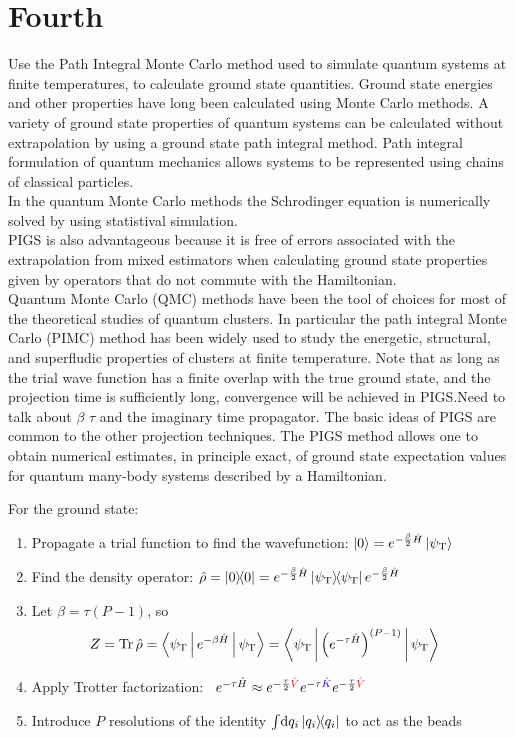 \documentclass[12pt,letterpaper, oneside, draft]{article}              %
\numberwithin{equation}{section} %
\newcommand{\psiT}{\psi_{\textrm{T}}}
\DeclareMathOperator{\Tr}{Tr}
\begin{document}
\section{Fourth}
 Use the Path Integral Monte Carlo method used to simulate quantum systems at finite temperatures, to calculate ground state quantities. Ground state energies and other properties have long been calculated using Monte Carlo methods. A variety of ground state properties of quantum systems can be calculated without extrapolation by using a ground state path integral method. Path integral formulation of quantum mechanics allows systems to be represented using chains of classical particles. \\
In the quantum Monte Carlo methods the Schrodinger equation is numerically solved by using statistival simulation. \\
PIGS is also advantageous because it is free of errors associated with the extrapolation from mixed estimators when calculating ground state properties given by operators that do not commute with the Hamiltonian. \\
Quantum Monte Carlo (QMC) methods have been the tool of choices for most of the theoretical studies of quantum clusters. In particular the path integral Monte Carlo (PIMC) method has been widely used to study the energetic, structural, and superfludic properties of clusters at finite temperature. Note that as long as the trial wave function has a finite overlap with the true ground state, and the projection time is sufficiently long, convergence will be achieved in PIGS.Need to talk about $\beta$ $\tau$ and the imaginary time propagator.
The basic ideas of PIGS are common to the other projection techniques. The PIGS method allows one to obtain numerical estimates, in principle exact, of ground state expectation values for quantum many-body systems described by a Hamiltonian.


For the ground state:
\begin{enumerate}\setlength{\itemindent}{1em}
	\item Propagate a trial function to find the wavefunction: $\ket{0} = e^{-\frac{\beta}{2} \hat{H}} \ket{\psiT}$
	\item Find the density operator: $\hat{\rho} = \ket{0}\!\!\bra{0} = e^{-\frac{\beta}{2} \hat{H}} \ket{\psiT}\!\!\bra{\psiT} e^{-\frac{\beta}{2} \hat{H}}$
	\item Let $\beta = \tau (P-1)$, so
		\begin{align*}
			Z
			&= \Tr{\hat{\rho}}
			= \Braket{\psiT | e^{-\beta \hat{H}} | \psiT}
			= \Braket{\psiT | \left( e^{-\tau \hat{H}} \right)^{(P-1)} | \psiT}
		\end{align*}
	\item Apply Trotter factorization:~\cite{schmidt2014inclusion}
		$
			e^{-\tau \hat{H}}
			\approx
				e^{-\frac{\tau}{2} \textcolor{red}{\hat{V}}}
				e^{-\tau \textcolor{blue}{\hat{K}}}
				e^{-\frac{\tau}{2} \textcolor{red}{\hat{V}}}
		$
	\item Introduce $P$ resolutions of the identity $\int\! \dif q_i \ket{q_i}\!\!\bra{q_i}$ to act as the beads
\end{enumerate}
\end{document}
